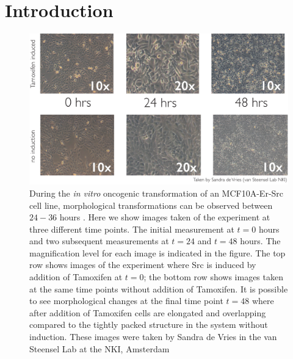
\section{Introduction}
\label{sec:introduction-mcf10}


\begin{figure}
  \centering
  \includegraphics[width=1\textwidth]{pics/mcf10a-experiment}
  \caption{During the {\it in vitro} oncogenic transformation of an MCF10A-Er-Src cell line, morphological transformations can be observed between $24-36$ hours \citep{Hirsch:2010ec}. Here we show images taken of the experiment at three different time points. The initial measurement at $t=0$ hours and two subsequent measurements at $t=24$ and $t=48$ hours. The magnification level for each image is indicated in the figure. The top row shows images of the experiment where Src is induced by addition of Tamoxifen at $t=0$; the bottom row shows images taken at the same time points without addition of Tamoxifen. It is possible to see morphological changes at the final time point $t=48$ where after addition of Tamoxifen cells are elongated and overlapping compared to the tightly packed structure in the system without induction. These images were taken by Sandra de Vries in the van Steensel Lab at the NKI, Amsterdam}
  \label{fig:exp-pics}
\end{figure}

